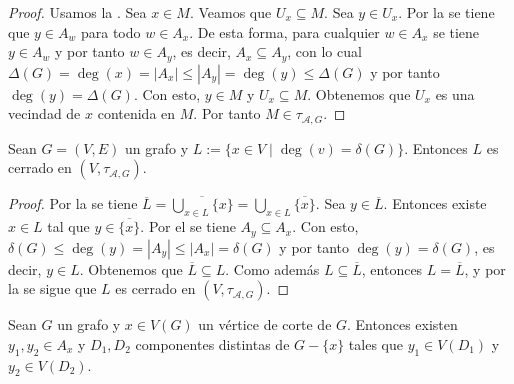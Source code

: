 \begin{proof}
   Usamos la . Sea $x\in M$. Veamos que $U_x\subseteq M$. Sea $y\in U_x$. Por la  se tiene que $y\in A_w$ para todo $w\in A_x$. De esta forma, para cualquier $w\in A_x$ se tiene $y\in A_w$ y por tanto $w\in A_y$, es decir, $A_x\subseteq A_y$, con lo cual $\Delta(G)=\operatorname{deg}(x)=|A_x|\le |A_y|=\operatorname{deg}(y)\le \Delta(G)$ y por tanto $\operatorname{deg}(y)=\Delta (G)$. Con esto, $y\in M$ y $U_x\subseteq M$. Obtenemos que $U_x$ es una vecindad de $x$ contenida en $M$. Por tanto $M\in\tau_{\mathcal{A},G}$. 
\end{proof}
\begin{Prop}
   Sean $G=(V,E)$ un grafo y $L:=\{x\in V\mid \operatorname{deg}(v)=\delta(G)\}$. Entonces $L$ es cerrado en $(V,\tau_{\mathcal{A},G})$. 
\end{Prop}
\begin{proof}
   Por la  se tiene $\overline{L}=\overline{\bigcup_{x\in L}\{x\}}=\bigcup_{x\in L}\overline{\{x\}}$. Sea $y\in \overline{L}$. Entonces existe $x\in L$ tal que $y\in\overline{\{x\}}$. Por el  se tiene $A_y\subseteq A_x$. Con esto, $\delta (G)\le \operatorname{deg}(y)=|A_y|\le |A_x|=\delta (G)$ y por tanto $\operatorname{deg}(y)=\delta(G)$, es decir, $y\in L$. Obtenemos que $\overline{L}\subseteq L$. Como además $L\subseteq\overline{L}$, entonces $L=\overline{L}$, y por la  se sigue que $L$ es cerrado en $(V,\tau_{\mathcal{A},G})$.
\end{proof}
\begin{Lema}\label{Lema:x_x}
   Sean $G$ un grafo y $x\in V(G)$ un vértice de corte de $G$. Entonces existen $y_1,y_2\in A_x$ y $D_1,D_2$ componentes distintas de $G-\{x\}$ tales que $y_1\in V(D_1)$ y $y_2\in V(D_2)$.
\end{Lema}
